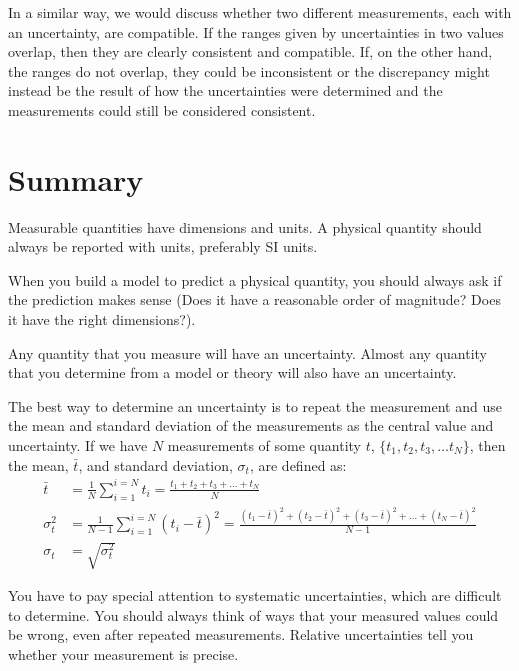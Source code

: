 In a similar way, we would discuss whether two different measurements, each with an uncertainty, are compatible. If the ranges given by uncertainties in two values overlap, then they are clearly consistent and compatible. If, on the other hand, the ranges do not overlap, they could be inconsistent or the discrepancy might instead be the result of how the uncertainties were determined and the measurements could still be considered consistent. 


\newpage
\section{Summary}
\vspace{1cm}
\begin{chapterSummary}
{
Measurable quantities have dimensions and units. A physical quantity should always be reported with units, preferably SI units.

When you build a model to predict a physical quantity, you should always ask if the prediction makes sense (Does it have a reasonable order of magnitude? Does it have the right dimensions?).

Any quantity that you measure will have an uncertainty. Almost any quantity that you determine from a model or theory will also have an uncertainty.

The best way to determine an uncertainty is to repeat the measurement and use the mean and standard deviation of the measurements as the central value and uncertainty. 
If we have $N$ measurements of some quantity $t$, $\{t_1, t_2, t_3, \dots t_N\}$, then the mean, $\bar t$, and standard deviation, $\sigma_t$, are defined as:
\begin{align*}
\bar t &= \frac{1}{N}\sum_{i=1}^{i=N} t_i=\frac{t_1 +t_2 +t_3 +\dots+ t_N}{N} \\
\sigma_t^2 &=\frac{1}{N-1}\sum_{i=1}^{i=N}(t_i-\bar t)^2 = \frac{(t_1-\bar t)^2+(t_2-\bar t)^2+(t_3-\bar t)^2+\dots+(t_N-\bar t)^2}{N-1} \\
\sigma_t &=\sqrt{\sigma_t^2}
\end{align*}


You have to pay special attention to systematic uncertainties, which are difficult to determine. You should always think of ways that your measured values could be wrong, even after repeated measurements. Relative uncertainties tell you whether your measurement is precise.

}
\end{chapterSummary}
